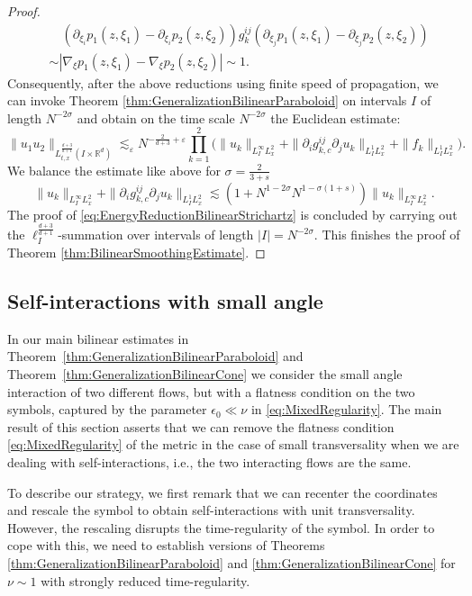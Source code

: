 \documentclass{amsart}
\theoremstyle{definition}
\newcommand{\R}{\mathbb{R}}
\begin{document}
\begin{proof}
\begin{equation*}
\begin{split}
&\quad (\partial_{\xi_i} p_1(z,\xi_1) - \partial_{\xi_i} p_2(z,\xi_2)) g^{ij}_k (\partial_{\xi_j} p_1(z,\xi_1) - \partial_{\xi_j} p_2(z,\xi_2))  \\
 &\sim | \nabla_{\xi} p_1(z,\xi_1) - \nabla_{\xi} p_2(z,\xi_2)| \sim 1.
\end{split}
\end{equation*}
Consequently, after the above reductions using finite speed of propagation, we can invoke Theorem \ref{thm:GeneralizationBilinearParaboloid} on intervals $I$ of length $N^{-2\sigma}$ and obtain on the time scale $N^{-2 \sigma}$ the Euclidean estimate:
\begin{equation*}
    \| u_1 u_2 \|_{L^{\frac{d+3}{d+1}}_{t,x}(I \times \R^d)} \lesssim_\varepsilon N^{-\frac{2}{d+3}+\varepsilon} \prod_{k=1}^2 \big( \| u_k \|_{L^\infty_I L^2_x} + \| \partial_i g^{ij}_{k,c} \partial_j u_k \|_{L_I^1 L^2_x} + \| f_k \|_{L_I^1 L_x^2} \big).
\end{equation*}
We balance the estimate like above for $\sigma = \frac{2}{3+s}$
\begin{equation*}
    \| u_k \|_{L^\infty_I L^2_x} + \| \partial_i g^{ij}_{k,c} \partial_j u_k \|_{L^1_I L^2_x} \lesssim (1 + N^{1-2 \sigma} N^{1- \sigma(1+s)}) \| u_k \|_{L^\infty_I L^2_x}.
\end{equation*}
The proof of \eqref{eq:EnergyReductionBilinearStrichartz} is concluded by carrying out the $\ell^{\frac{d+3}{d+1}}_I$-summation over intervals of length $|I| = N^{-2 \sigma}$.  This finishes the proof of Theorem \ref{thm:BilinearSmoothingEstimate}.
\end{proof}

\subsection{Self-interactions with small angle}
\label{subsection:SelfInteractions}
In our main bilinear estimates in Theorem~\ref{thm:GeneralizationBilinearParaboloid} and Theorem~\ref{thm:GeneralizationBilinearCone} we consider the small angle interaction of two different flows, 
but with a flatness condition on the two symbols, captured by the parameter $\epsilon_0 \ll \nu$ in \eqref{eq:MixedRegularity}. The main result of this section asserts that we can remove the flatness condition \eqref{eq:MixedRegularity} of the metric in the case of small transversality when we are dealing with self-interactions, i.e., the two interacting flows are the same. 

To describe our strategy, we first remark 
that we can recenter the coordinates and rescale the symbol to obtain self-interactions with unit transversality. However, the rescaling disrupts the time-regularity of the symbol. In order to cope with this, we need to establish versions of Theorems \ref{thm:GeneralizationBilinearParaboloid} and \ref{thm:GeneralizationBilinearCone} for $\nu \sim 1$ with strongly reduced time-regularity.
\end{document}
